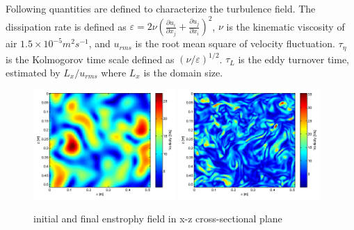 \documentclass[12pt]{article}
\begin{document}
Following quantities are defined to characterize the turbulence field. 
The dissipation rate is defined as $\varepsilon=2\nu(\frac{\partial u_{i}}{\partial x_{j}}+\frac{\partial u_{j}}{\partial x_{i}})^{2}$,
$\nu$ is the kinematic viscosity of air $1.5\times10^{-5}m^{2}s^{-1}$, and $u_{rms}$
is the root mean square of velocity fluctuation. $\tau_{\eta}$ is
the Kolmogorov time scale defined as $(\nu/\varepsilon)^{1/2}$. $\tau_L$
is the eddy turnover time, estimated by $L_x/u_{rms}$
where $L_x$ is the domain size.

\begin{figure}[H]
\includegraphics[width=0.48\textwidth]{Figures/vortex-0}
\includegraphics[width=0.48\textwidth]{Figures/vortex-1}

\caption{initial and final enstrophy field in x-z cross-sectional
plane\label{fig:enstrophy}}
\end{figure}
\end{document}
